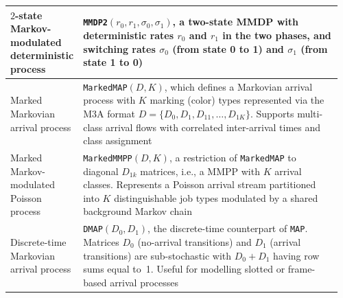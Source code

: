 \begin{table}[t!]
{\begin{tabular}{|p{0.18\linewidth}|p{0.78\linewidth}|}
\hline
$2$-state Markov-modulated deterministic process & \texttt{MMDP2}$(r_0,r_1,\sigma_0,\sigma_1)$, a two-state MMDP with deterministic rates $r_0$ and $r_1$ in the two phases, and switching rates $\sigma_0$ (from state 0 to 1) and $\sigma_1$ (from state 1 to 0) \\
\hline
Marked Markovian arrival process\index{MarkedMAP|see{Network models}} & \texttt{MarkedMAP}$(D,K)$, which defines a Markovian arrival process with $K$ marking (color) types represented via the M3A format $D=\{D_0,D_1,D_{11},\ldots,D_{1K}\}$. Supports multi-class arrival flows with correlated inter-arrival times and class assignment \\
\hline
Marked Markov-modulated Poisson process\index{MarkedMMPP|see{Network models}} & \texttt{MarkedMMPP}$(D,K)$, a restriction of \texttt{MarkedMAP} to diagonal $D_{1k}$ matrices, i.e., a MMPP with $K$ arrival classes. Represents a Poisson arrival stream partitioned into $K$ distinguishable job types modulated by a shared background Markov chain \\
\hline
Discrete-time Markovian arrival process\index{DMAP (Discrete-time MAP)|see{Network models}} & \texttt{DMAP}$(D_0,D_1)$, the discrete-time counterpart of \texttt{MAP}. Matrices $D_0$ (no-arrival transitions) and $D_1$ (arrival transitions) are sub-stochastic with $D_0+D_1$ having row sums equal to~1. Useful for modelling slotted or frame-based arrival processes \\
\hline
\end{tabular}
}
\end{table}


